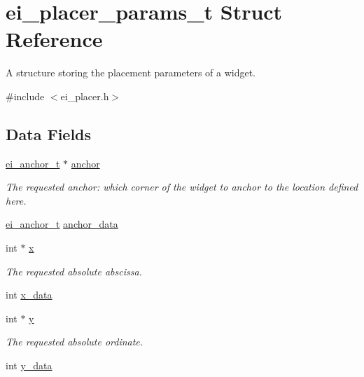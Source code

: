 \hypertarget{structei__placer__params__t}{}\section{ei\+\_\+placer\+\_\+params\+\_\+t Struct Reference}
\label{structei__placer__params__t}


A structure storing the placement parameters of a widget.  




{\ttfamily \#include $<$ei\+\_\+placer.\+h$>$}

\subsection*{Data Fields}
\begin{DoxyCompactItemize}
\item 
\hyperlink{ei__types_8h_a3852c963af609d31d7cfcff79c4c8450}{ei\+\_\+anchor\+\_\+t} $\ast$ \hyperlink{structei__placer__params__t_ada4443b28a68ad51ab28667dbe23902c}{anchor}
\begin{DoxyCompactList}\small\item\em The requested anchor\+: which corner of the widget to anchor to the location defined here. \end{DoxyCompactList}\item 
\hyperlink{ei__types_8h_a3852c963af609d31d7cfcff79c4c8450}{ei\+\_\+anchor\+\_\+t} \hyperlink{structei__placer__params__t_a8351a31ff125a983c8640c93699309dd}{anchor\+\_\+data}
\item 
int $\ast$ \hyperlink{structei__placer__params__t_ae8562a49f17673cd02409d34fdc81154}{x}
\begin{DoxyCompactList}\small\item\em The requested absolute abscissa. \end{DoxyCompactList}\item 
int \hyperlink{structei__placer__params__t_ae6078f805f079c2ac6e54ecfbe321c50}{x\+\_\+data}
\item 
int $\ast$ \hyperlink{structei__placer__params__t_a1a59b5414bc00a277b71d84adab2ceae}{y}
\begin{DoxyCompactList}\small\item\em The requested absolute ordinate. \end{DoxyCompactList}\item 
int \hyperlink{structei__placer__params__t_afa297c58c25de969e3aaf5c01456b04f}{y\+\_\+data}
\item 

\end{DoxyCompactItemize}
